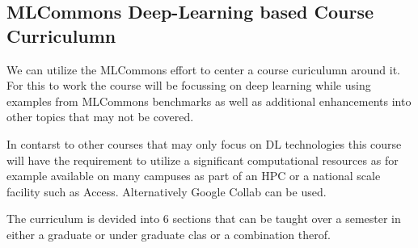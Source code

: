 \subsection{MLCommons Deep-Learning based Course Curriculumn}

We can utilize the MLCommons effort to center a course curiculumn
around it. For this to work the course will be focussing on deep
learning while using examples from MLCommons benchmarks as well as
additional enhancements into other topics that may not be covered.

In contarst to other courses that may only focus on DL technologies
this course will have the requirement to utilize a significant
computational resources as for example available on many campuses as
part of an HPC or a national scale facility such as
Access. Alternatively Google Collab can be used.

The curriculum is devided into 6 sections that can be taught over a
semester in either a graduate or under graduate clas or a combination
therof.

